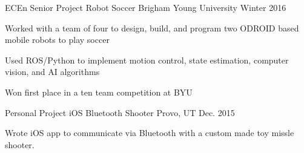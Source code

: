 \begin{cventries}
  \cventry
    {ECEn Senior Project} %
    {Robot Soccer} %
    {Brigham Young University} %
    {Winter 2016} %
    {
      \begin{cvitems} %
      \item {Worked with a team of four to design, build, and program two ODROID based mobile robots to play soccer}
      \item {Used ROS/Python to implement motion control, state estimation, computer vision, and AI algorithms}
      \item {Won first place in a ten team competition at BYU}
      \end{cvitems}
    }

  \cventry
    {Personal Project} %
    {iOS Bluetooth Shooter} %
    {Provo, UT} %
    {Dec. 2015} %
    {
      \begin{cvitems} %
      \item {Wrote iOS app to communicate via Bluetooth with a custom made toy missle shooter.}
      \end{cvitems}
    }

\end{cventries}
